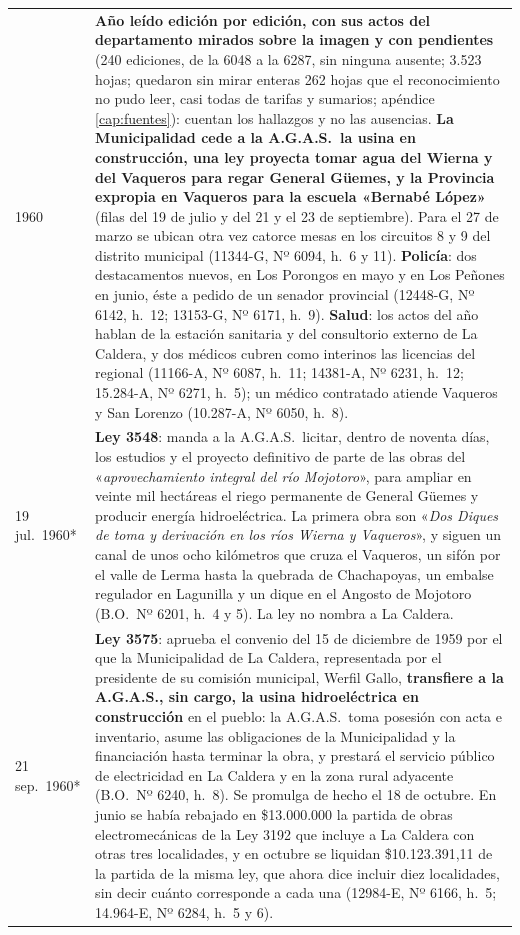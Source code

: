 \begin{longtable}{@{}p{2.7cm}p{10.3cm}@{}}
1960 & \textbf{Año leído edición por edición, con sus actos del departamento mirados sobre la imagen y con pendientes} (240 ediciones, de la 6048 a la 6287, sin ninguna ausente; 3.523 hojas; quedaron sin mirar enteras 262 hojas que el reconocimiento no pudo leer, casi todas de tarifas y sumarios; apéndice \ref{cap:fuentes}): cuentan los hallazgos y no las ausencias. \textbf{La Municipalidad cede a la A.G.A.S.\ la usina en construcción, una ley proyecta tomar agua del Wierna y del Vaqueros para regar General Güemes, y la Provincia expropia en Vaqueros para la escuela «Bernabé López»} (filas del 19 de julio y del 21 y el 23 de septiembre). Para el 27 de marzo se ubican otra vez catorce mesas en los circuitos 8 y 9 del distrito municipal (11344-G, Nº 6094, h.\ 6 y 11). \textbf{Policía}: dos destacamentos nuevos, en Los Porongos en mayo y en Los Peñones en junio, éste a pedido de un senador provincial (12448-G, Nº 6142, h.\ 12; 13153-G, Nº 6171, h.\ 9). \textbf{Salud}: los actos del año hablan de la estación sanitaria y del consultorio externo de La Caldera, y dos médicos cubren como interinos las licencias del regional (11166-A, Nº 6087, h.\ 11; 14381-A, Nº 6231, h.\ 12; 15.284-A, Nº 6271, h.\ 5); un médico contratado atiende Vaqueros y San Lorenzo (10.287-A, Nº 6050, h.\ 8). \\
19 jul.\ 1960* & \textbf{Ley 3548}: manda a la A.G.A.S.\ licitar, dentro de noventa días, los estudios y el proyecto definitivo de parte de las obras del «\textit{aprovechamiento integral del río Mojotoro}», para ampliar en veinte mil hectáreas el riego permanente de General Güemes y producir energía hidroeléctrica. La primera obra son «\textit{Dos Diques de toma y derivación en los ríos Wierna y Vaqueros}», y siguen un canal de unos ocho kilómetros que cruza el Vaqueros, un sifón por el valle de Lerma hasta la quebrada de Chachapoyas, un embalse regulador en Lagunilla y un dique en el Angosto de Mojotoro (B.O.\ Nº 6201, h.\ 4 y 5). La ley no nombra a La Caldera. \\
21 sep.\ 1960* & \textbf{Ley 3575}: aprueba el convenio del 15 de diciembre de 1959 por el que la Municipalidad de La Caldera, representada por el presidente de su comisión municipal, Werfil Gallo, \textbf{transfiere a la A.G.A.S., sin cargo, la usina hidroeléctrica en construcción} en el pueblo: la A.G.A.S.\ toma posesión con acta e inventario, asume las obligaciones de la Municipalidad y la financiación hasta terminar la obra, y prestará el servicio público de electricidad en La Caldera y en la zona rural adyacente (B.O.\ Nº 6240, h.\ 8). Se promulga de hecho el 18 de octubre. En junio se había rebajado en \$13.000.000 la partida de obras electromecánicas de la Ley 3192 que incluye a La Caldera con otras tres localidades, y en octubre se liquidan \$10.123.391,11 de la partida de la misma ley, que ahora dice incluir diez localidades, sin decir cuánto corresponde a cada una (12984-E, Nº 6166, h.\ 5; 14.964-E, Nº 6284, h.\ 5 y 6). \\

\end{longtable}

